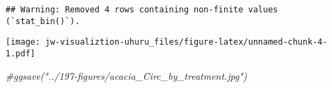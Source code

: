 \documentclass[
]{article}
\newenvironment{Shaded}{\begin{snugshade}}{\end{snugshade}}
\newcommand{\CommentTok}[1]{\textcolor[rgb]{0.56,0.35,0.01}{\textit{#1}}}
\begin{document}
\begin{verbatim}
## Warning: Removed 4 rows containing non-finite values (`stat_bin()`).
\end{verbatim}

\texttt{[image: jw-visualiztion-uhuru\_files/figure-latex/unnamed-chunk-4-1.pdf]}

\begin{Shaded}
\begin{Highlighting}[]
  \CommentTok{\#ggsave("../197{-}figures/acacia\_Circ\_by\_treatment.jpg")}
\end{Highlighting}
\end{Shaded}
\end{document}
